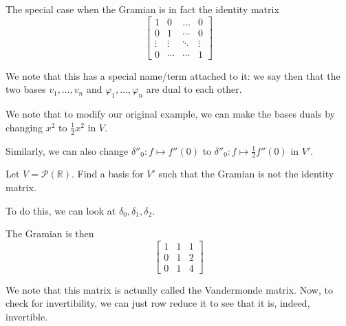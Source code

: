 \documentclass[openany]{book}
\newcommand{\RR}{\mathbb{R}}
\begin{document}
\begin{thm}
	The special case when the Gramian is in fact the identity matrix
	\begin{equation*}
		\begin{bmatrix}
			1 & 0 & \ldots & 0 \\
			0 & 1 & \cdots & 0 \\
			\vdots & \vdots & \ddots & \vdots \\
			0 & \cdots & \cdots  & 1
		\end{bmatrix}
	\end{equation*}

	We note that this has a special name/term attached to it: we say then that the two bases $v_{1}, \ldots, v_{n}$ and $\varphi_1, \ldots, \varphi_{n}$ are dual to each other.
\end{thm}
\begin{rmk}
	We note that to modify our original example, we can make the bases duals by changing $x^{2}$ to $\frac{1}{2} x^{2}$ in $V$.
	
	Similarly, we can also change $\delta''_{0} : f \mapsto f''(0)$ to $\delta''_{0}: f \mapsto \frac{1}{2} f''(0)$ in $V'$.
\end{rmk}

\begin{example}
	Let $V = \mathscr P(\RR)$. Find a basis for $V'$ such that the Gramian is not the identity matrix.
	
	To do this, we can look at $\delta_0, \delta_1, \delta_2$.
	
	The Gramian is then
	\begin{equation*}
		\begin{bmatrix}
			1 & 1 & 1 \\ 0 & 1 & 2 \\ 0 & 1 & 4
		\end{bmatrix}
	\end{equation*}
	
	We note that this matrix is actually called the Vandermonde matrix. Now, to check for invertibility, we can just row reduce it to see that it is, indeed, invertible.
\end{example}
\end{document}
